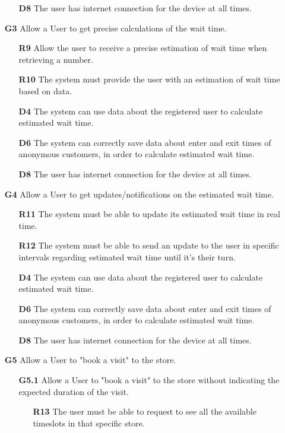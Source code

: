 \begin{enumerate}
\begin{enumerate}
		\item [\textbf{D8}] The user has internet connection for the device at all times.
	\end{enumerate}
	\item [\textbf{G3}] Allow a User to get precise calculations of the wait time.
	\begin{enumerate}
		\item [\textbf{R9}] Allow the user to receive a precise estimation of wait time when retrieving a number.
		\item [\textbf{R10}] The system must provide the user with an estimation of wait time based on data.
		\item [\textbf{D4}] The system can use data about the registered user to calculate estimated wait time.
		\item [\textbf{D6}] The system can correctly save data about enter and exit times of anonymous customers, in order to calculate estimated wait time.
		\item [\textbf{D8}] The user has internet connection for the device at all times.
	\end{enumerate}
	\item [\textbf{G4}] Allow a User to get updates/notifications on the estimated wait time.
	\begin{enumerate}
		\item [\textbf{R11}] The system must be able to update its estimated wait time in real time.
		\item [\textbf{R12}] The system must be able to send an update to the user in specific intervals regarding estimated wait time until it's their turn.
		\item [\textbf{D4}] The system can use data about the registered user to calculate estimated wait time.
		\item [\textbf{D6}] The system can correctly save data about enter and exit times of anonymous customers, in order to calculate estimated wait time.
		\item [\textbf{D8}] The user has internet connection for the device at all times.
	\end{enumerate}
	\item [\textbf{G5}] Allow a User to "book a visit" to the store.
	\begin{enumerate}
		\item [\textbf{G5.1}] Allow a User to "book a visit" to the store without indicating the expected duration of the visit.
		\begin{enumerate}
			\item [\textbf{R13}] The user must be able to request to see all the available timeslots in that specific store.

\end{enumerate}
\end{enumerate}
\end{enumerate}
